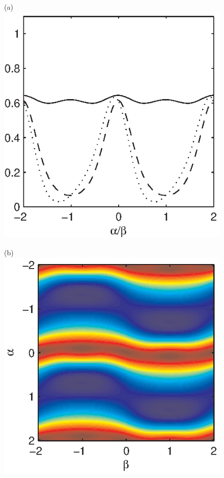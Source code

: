 \documentclass[dvips,aoas,preprint]{imsart}
\numberwithin{equation}{section}
\theoremstyle{plain}
\begin{document}
\begin{figure}[!htbp]
    \begin{minipage}[]{0.32\textwidth}
      \centering
      (a)
      \includegraphics*[width=\textwidth]{pdfen12b.eps}
    \end{minipage}
    \begin{minipage}[]{0.35\textwidth}
      \centering
      (b)
      \includegraphics*[width=\textwidth]{pdfen12.eps}

\end{minipage}
\end{figure}
\end{document}
